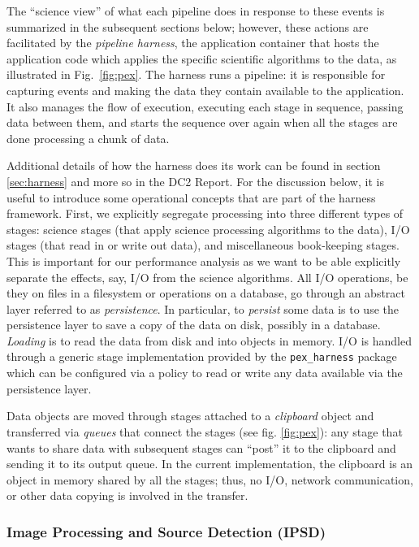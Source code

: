 The ``science view'' of what each pipeline does in response to these
events is summarized in the subsequent sections below; however, these
actions are facilitated by the \textit{pipeline harness}, the
application container that hosts the application code which applies
the specific scientific algorithms to the data, as illustrated in
Fig.~\ref{fig:pex}.  The harness runs a pipeline: it is responsible
for capturing events and making the data they contain available to the
application.  It also manages the flow of execution, executing each
stage in sequence, passing data between them, and starts the sequence
over again when all the stages are done processing a chunk of data.  

Additional details of how the harness does its work can be found in
section \ref{sec:harness} and more so in the DC2 Report.  For the
discussion below, it is useful to introduce some operational concepts
that are part of the harness framework.  First, we explicitly
segregate processing into three different types of stages:  science
stages (that apply science processing algorithms to the data), I/O
stages (that read in or write out data), and miscellaneous
book-keeping stages.  This is important for our performance analysis
as we want to be able explicitly separate the effects, say, I/O from
the science algorithms.  All I/O operations, be they on files in a
filesystem or operations on a database, go through an abstract
layer referred to as \textit{persistence}.  In particular, to
\textit{persist} some data is to use the persistence layer to save a
copy of the data on disk, possibly in a database.  \textit{Loading} is to
read the data from disk and into objects in memory.  I/O is handled
through a generic stage implementation provided by the
\texttt{pex\_harness} package which can be configured via a policy to
read or write any data available via the persistence layer.  

Data objects are moved through stages attached to a \textit{clipboard}
object and transferred via \textit{queues} that connect the stages
(see fig. \ref{fig:pex}): any stage that wants to share data with
subsequent stages can ``post'' it to the clipboard and sending it to
its output queue.  In the current implementation, the clipboard is an
object in memory shared by all the stages; thus, no I/O, network
communication, or other data copying is involved in the transfer.

\subsubsection{Image Processing and Source Detection (IPSD)}

